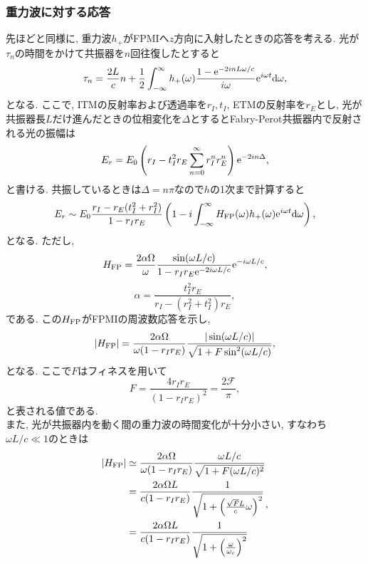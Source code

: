 \subsubsection{重力波に対する応答}
\vskip3mm
先ほどと同様に, 重力波$h_{+}$がFPMIへ$z$方向に入射したときの応答を考える. 光が$\tau_n$の時間をかけて共振器を$n$回往復したとすると
\begin{equation}
\tau_n=\frac{2L}{c}n+\frac{1}{2}\int_{-\infty}^{\infty}h_+(\omega)\frac{1-{\rm e}^{-2inL\omega/c}}{i\omega}{\rm e}^{i\omega t}{\rm d}\omega,
\end{equation}
となる. ここで, ITMの反射率および透過率を$r_I,t_I$, ETMの反射率を$r_E$とし, 光が共振器長$L$だけ進んだときの位相変化を$\Delta$とするとFabry-Perot共振器内で反射される光の振幅は
\begin{equation}
E_r=E_0\left(r_I-t_I^2r_E\sum_{n=0}^{\infty}r_I^{n}r_E^{n}\right){\rm e}^{-2in\Delta},
\end{equation}
と書ける. 共振しているときは$\Delta=n\pi$なので$h$の1次まで計算すると
\begin{equation}
E_r\sim E_0\frac{r_I-r_E(t_I^2+r_I^2)}{1-r_Ir_E}\left(1-i\int_{-\infty}^{\infty}H_{\rm FP}(\omega)h_+(\omega){\rm e}^{i\omega t}{\rm d}\omega\right),
\end{equation}
となる. ただし, 
\begin{equation}
H_{\rm FP}=\frac{2\alpha\Omega}{\omega}\frac{\sin(\omega L/c)}{1-r_Ir_E{\rm e}^{-2i\omega L/c}}{\rm e}^{-i\omega L/c},
\end{equation}
\begin{equation}
\alpha=\frac{t_I^2r_E}{r_I-(r_I^2+t_I^2)r_E},
\end{equation}
である. この$H_{\rm FP}$がFPMIの周波数応答を示し, 
\begin{equation}
|H_{\rm FP}|=\frac{2\alpha\Omega}{\omega(1-r_Ir_E)}\frac{|\sin(\omega L/c)|}{\sqrt{1+F\sin^2(\omega L/c)}},
\end{equation}
となる. ここで$F$はフィネスを用いて
\begin{equation}
F=\frac{4r_Ir_E}{(1-r_Ir_E)^2}=\frac{2\mathcal{F}}{\pi},
\end{equation}
と表される値である. \\
\quad また, 光が共振器内を動く間の重力波の時間変化が十分小さい, すなわち$\omega L/c\ll 1$のときは
\begin{equation}
\begin{split}
|H_{\rm FP}|&\simeq\frac{2\alpha\Omega}{\omega(1-r_Ir_E)}\frac{\omega L/c}{\sqrt{1+F(\omega L/c)^2}}\\
&=\frac{2\alpha\Omega L}{c(1-r_Ir_E)}\frac{1}{\sqrt{1+\left(\frac{\sqrt{F}L}{c}\omega\right)^2}}\\
&=\frac{2\alpha\Omega L}{c(1-r_Ir_E)}\frac{1}{\sqrt{1+\left(\frac{\omega}{\omega_c}\right)^2}}
\end{split},
\label{eq2.78}
\end{equation}
